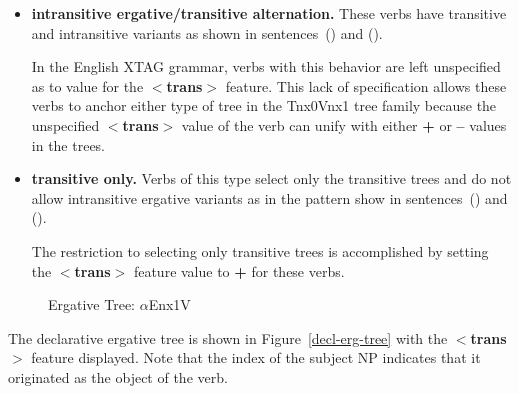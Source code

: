 \begin{itemize}
\item {\bf intransitive ergative/transitive alternation.}  These verbs
have transitive and intransitive variants as shown in sentences~() and
().



In the English XTAG grammar, verbs with this behavior are left unspecified as
to value for the {\bf$<$trans$>$} feature.  This lack of specification allows
these verbs to anchor either type of tree in the Tnx0Vnx1 tree family because
the unspecified {\bf$<$trans$>$} value of the verb can unify with either {\bf
+} or {\bf --} values in the trees.

\item {\bf transitive only.}  Verbs of this type select only the
transitive trees and do not allow intransitive ergative variants as in
the pattern show in sentences~() and ().


The restriction to selecting only transitive trees is accomplished by
setting the {\bf$<$trans$>$} feature value to {\bf +} for these verbs.
\end{itemize}

\begin{figure}[htb]
\centering
\mbox{}
\caption{Ergative Tree: $\alpha$Enx1V}
\label{decl-erg-tree}
\label{2;14,1}
\end{figure}

The declarative ergative tree is shown in Figure~\ref{decl-erg-tree} with the
{\bf $<$trans$>$} feature displayed.  Note that the index of the subject NP
indicates that it originated as the object of the verb.


